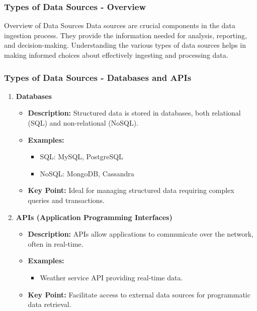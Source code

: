 \documentclass{beamer}
\begin{document}
\begin{frame}
    \frametitle{Types of Data Sources - Overview}
    \begin{block}{Overview of Data Sources}
        Data sources are crucial components in the data ingestion process. They provide the information needed for analysis, reporting, and decision-making. Understanding the various types of data sources helps in making informed choices about effectively ingesting and processing data.
    \end{block}
\end{frame}

\begin{frame}
    \frametitle{Types of Data Sources - Databases and APIs}
    \begin{enumerate}
        \item \textbf{Databases}
            \begin{itemize}
                \item \textbf{Description:} Structured data is stored in databases, both relational (SQL) and non-relational (NoSQL).
                \item \textbf{Examples:}
                    \begin{itemize}
                        \item SQL: MySQL, PostgreSQL
                        \item NoSQL: MongoDB, Cassandra
                    \end{itemize}
                \item \textbf{Key Point:} Ideal for managing structured data requiring complex queries and transactions.
            \end{itemize}
        
        \item \textbf{APIs (Application Programming Interfaces)}
            \begin{itemize}
                \item \textbf{Description:} APIs allow applications to communicate over the network, often in real-time.
                \item \textbf{Examples:}
                    \begin{itemize}
                        \item Weather service API providing real-time data.
                    \end{itemize}
                \item \textbf{Key Point:} Facilitate access to external data sources for programmatic data retrieval.
            \end{itemize}
    \end{enumerate}
\end{frame}
\end{document}
